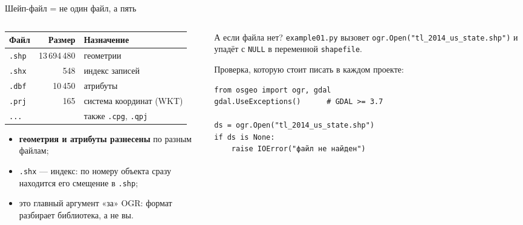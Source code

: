\documentclass[aspectratio=169,10pt]{beamer}
\begin{document}
\begin{frame}[fragile]{Шейп-файл = не один файл, а пять}
\footnotesize
\begin{columns}[T,onlytextwidth]
  \begin{column}{0.54\textwidth}
    \begin{tabular}{@{}lrl@{}}
      \toprule
      Файл & Размер & Назначение \\
      \midrule
      \texttt{.shp} & 13\,694\,480 & геометрии \\
      \texttt{.shx} & 548         & индекс записей \\
      \texttt{.dbf} & 10\,450     & атрибуты \\
      \texttt{.prj} & 165         & система координат (WKT) \\
      \texttt{...}  &             & также \texttt{.cpg}, \texttt{.qpj} \\
      \bottomrule
    \end{tabular}
    \vspace{0.6em}
    \begin{itemize}\itemsep1pt
      \item \textbf{геометрия и атрибуты разнесены} по разным файлам;
      \item \texttt{.shx} --- индекс: по номеру объекта сразу находится
            его смещение в \texttt{.shp};
      \item это главный аргумент «за» OGR: формат разбирает библиотека,
            а не вы.
    \end{itemize}
  \end{column}
  \begin{column}{0.44\textwidth}
    \begin{block}{А если файла нет?}
      \small
      \texttt{example01.py} вызовет
      \texttt{ogr.Open("tl\_2014\_us\_state.shp")} и упадёт с \texttt{NULL}
      в переменной \texttt{shapefile}.
    \end{block}
    \vspace{0.2em}
    {\scriptsize Проверка, которую стоит писать в каждом проекте:}
    \begin{Verbatim}[numbers=none,fontsize=\scriptsize]
from osgeo import ogr, gdal
gdal.UseExceptions()      # GDAL >= 3.7

ds = ogr.Open("tl_2014_us_state.shp")
if ds is None:
    raise IOError("файл не найден")
\end{Verbatim}
  \end{column}
\end{columns}
\end{frame}
\end{document}
